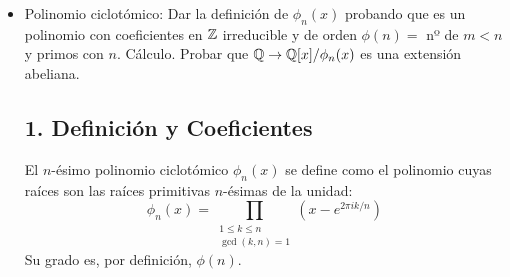 \begin{itemize}
\subsection*{3. Carácter cíclico de las extensiones de cuerpos finitos}
Sea $\mathbb{F}_q \hookrightarrow \mathbb{F}_{q^n}$ una extensión de cuerpos finitos de grado $n$. 

\begin{itemize}
    \item \textbf{Extensión de Galois:} La extensión es de Galois pues el grupo de automorfismos $G = \text{Aut}_{\mathbb{F}_q}(\mathbb{F}_{q^n})$ está generado por el automorfismo de Frobenius relativo a $\mathbb{F}_q$, definido como $\tau(b) = b^q$.
    \item \textbf{Orden del grupo:} El orden del grupo de Galois coincide con el grado de la extensión, $|G| = n$.
    \item \textbf{Generador:} Se verifica que $\tau^n(b) = b^{q^n} = b$ para todo $b \in \mathbb{F}_{q^n}$, por lo que $\tau^n = Id$. Al no existir una potencia menor que sea la identidad, $\tau$ es un generador de orden $n$.
    \item \textbf{Conclusión:} Al estar generado por un único elemento ($\tau$), el grupo de Galois es cíclico: $G = \langle \tau \rangle = \{\tau, \tau^2, \dots, \tau^n = Id\}$.
\end{itemize}
    \item Polinomio ciclotómico: Dar la definici\'on de $\phi_n(x)$ probando que es un polinomio con coeficientes en $\mathbb{Z}$ irreducible y de orden $\phi(n) =$ nº de $m < n$ y primos con $n$. Cálculo. Probar que $\mathbb{Q} \rightarrow \mathbb{Q}[x]/\phi_n(x)$ es una extensi\'on abeliana.
\subsection*{1. Definición y Coeficientes}
\begin{defi}
El $n$-ésimo polinomio ciclotómico $\phi_n(x)$ se define como el polinomio cuyas raíces son las raíces primitivas $n$-ésimas de la unidad:
\[ \phi_n(x) = \prod_{\substack{1 \le k \le n \\ \gcd(k,n)=1}} (x - e^{2\pi i k / n}) \]
Su grado es, por definición, $\phi(n)$.
\end{defi}


\end{itemize}
